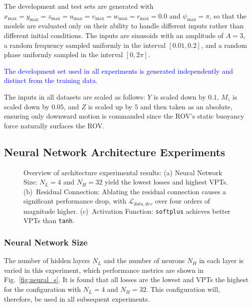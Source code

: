 The development and test sets are generated with $x_{\max} = y_{\max} = z_{\max} = u_{\max} = v_{\max} = w_{\max} = r_{\max} = 0.0$ and $\psi_{\max} = \pi$, so that the models are evaluated only on their ability to handle different inputs rather than different initial conditions. The inputs are sinusoids with an amplitude of $A=3$, a random frequency sampled uniformly in the interval $[0.01, 0.2]$, and a random phase uniformly sampled in the interval $[0, 2\pi]$.

\begin{remark} \textcolor{blue}{The development set used in all experiments is generated independently and distinct from the training data.} \end{remark}


\begin{remark}
    The inputs in all datasets are scaled as follows: $Y$ is scaled down by $0.1$, $M_z$ is scaled down by $0.05$, and $Z$ is scaled up by $5$ and then taken as an absolute, ensuring only downward motion is commanded since the ROV's static buoyancy force naturally surfaces the ROV.
\end{remark}



\subsection{Neural Network Architecture Experiments}
\label{subsec:nn_arch}

\newcommand{\PlotHeight}{6cm}

\begin{figure}[!t]
    \caption{Overview of architecture experimental results: (a) Neural Network Size: $N_L = 4$ and $N_H = 32$ yield the lowest losses and highest VPTs. (b)~Residual Connection: Ablating the residual connection causes a significant performance drop, with $\mathcal{L}_{data,dev}$ over four orders of magnitude higher. (c)~Activation Function: \lstinline|softplus| achieves better VPTs than \lstinline|tanh|.}
    \label{fig:architecture}
\end{figure}

\subsubsection{Neural Network Size}
The number of hidden layers $N_L$ and the number of neurons $N_H$ in each layer is varied in this experiment, which performance metrics are shown in Fig.~\ref{fig:neural_s}. It is found that all losses are the lowest and VPTs the highest for the configuration with $N_L = 4$ and $N_H = 32$. This configuration will, therefore, be used in all subsequent experiments.


